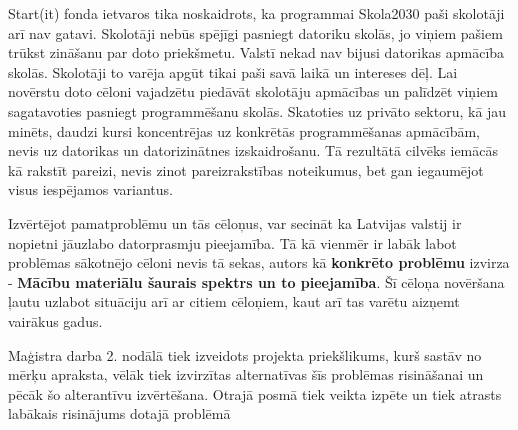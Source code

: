 \begin{enumerate}
Start(it) fonda ietvaros tika noskaidrots, ka programmai Skola2030 paši skolotāji arī nav gatavi. Skolotāji nebūs
spējīgi pasniegt datoriku skolās, jo viņiem pašiem trūkst zināšanu par doto priekšmetu. Valstī nekad nav bijusi 
datorikas apmācība skolās. Skolotāji to varēja apgūt tikai paši savā laikā un intereses dēļ. Lai novērstu
doto cēloni vajadzētu piedāvāt skolotāju apmācības un palīdzēt viņiem sagatavoties pasniegt programmēšanu skolās.
Skatoties uz privāto sektoru, kā jau minēts, daudzi kursi koncentrējas uz konkrētās programmēšanas apmācībām, nevis
uz datorikas un datorizinātnes izskaidrošanu. Tā rezultātā cilvēks iemācās kā rakstīt pareizi, nevis zinot
pareizrakstības noteikumus, bet gan iegaumējot visus iespējamos variantus.
\end{enumerate}
\par
Izvērtējot pamatproblēmu un tās cēloņus, var secināt ka Latvijas valstij ir nopietni jāuzlabo datorprasmju 
pieejamība. Tā kā vienmēr ir labāk labot problēmas sākotnējo cēloni nevis tā sekas, autors
kā \textbf{konkrēto problēmu} izvirza - \textbf{Mācību materiālu šaurais spektrs un to pieejamība}.
Šī cēloņa novēršana ļautu uzlabot situāciju arī ar citiem cēloņiem, kaut arī tas varētu aizņemt vairākus gadus.
\par
Maģistra darba 2. nodālā tiek izveidots projekta priekšlikums, kurš sastāv no mērķu apraksta,
vēlāk tiek izvirzītas alternatīvas šīs problēmas risināšanai un pēcāk šo alterantīvu izvērtēšana.
Otrajā posmā tiek veikta izpēte un tiek atrasts labākais risinājums dotajā problēmā